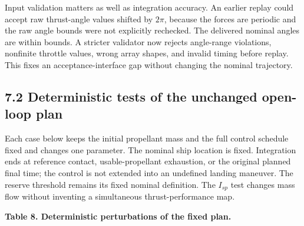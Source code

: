 \documentclass[
  11pt,
  a4paper,
]{article}
\begin{document}
Input validation matters as well as integration accuracy. An earlier
replay could accept raw thrust-angle values shifted by \(2\pi\), because
the forces are periodic and the raw angle bounds were not explicitly
rechecked. The delivered nominal angles are within bounds. A stricter
validator now rejects angle-range violations, nonfinite throttle values,
wrong array shapes, and invalid timing before replay. This fixes an
acceptance-interface gap without changing the nominal trajectory.

\subsection{7.2 Deterministic tests of the unchanged open-loop
plan}\label{deterministic-tests-of-the-unchanged-open-loop-plan}

Each case below keeps the initial propellant mass and the full control
schedule fixed and changes one parameter. The nominal ship location is
fixed. Integration ends at reference contact, usable-propellant
exhaustion, or the original planned final time; the control is not
extended into an undefined landing maneuver. The reserve threshold
remains its fixed nominal definition. The \(I_{sp}\) test changes mass
flow without inventing a simultaneous thrust-performance map.

\textbf{Table 8. Deterministic perturbations of the fixed plan.}
\end{document}
